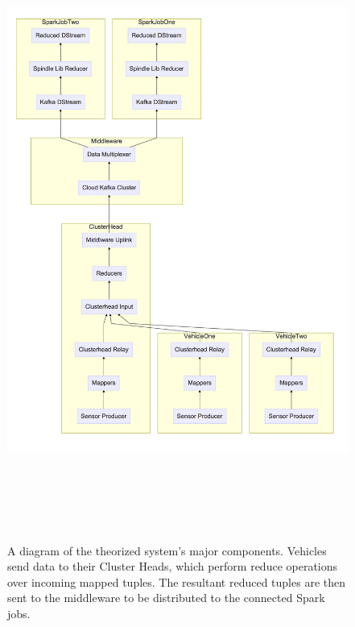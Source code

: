 \documentclass{thesis}
\begin{document}
    \begin{figure}
        \centering
        \includegraphics[height=8in, width=5in]{binImages/theoretical-system.png}
        \caption{A diagram of the theorized system's major components. Vehicles
        send data to their Cluster Heads, which perform reduce operations over
        incoming mapped tuples. The resultant reduced tuples are then sent to
        the middleware to be distributed to the connected Spark jobs.}
        \label{fig:theoretical:component}
    \end{figure}
\end{document}
